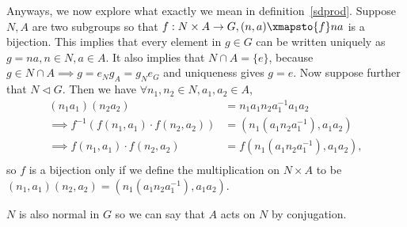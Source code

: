 Anyways, we now explore what exactly we mean in
definition~\ref{sdprod}. Suppose $N, A$ are two subgroups so that $f : N
\times A \to G, (n, a) \xmapsto{f} na$ is a bijection. This implies that
every element in $g \in G$ can be written uniquely as $g = na, n \in N,
a \in A$.  It also implies that $N \cap A = \lbrace e \rbrace$, because
$g \in N \cap A \implies g = e_N g_A = g_N e_G$ and uniqueness gives $g
= e$. Now suppose further that $N \lhd G$. Then we have $\forall n_1,
n_2 \in N, a_1, a_2 \in A$,
\[ \begin{aligned}
(n_1 a_1)(n_2 a_2) &= n_1 a_1 n_2 a_1^{-1} a_1 a_2 \\
\implies f^{-1}(f(n_1, a_1) \cdot f(n_2, a_2)) &= (n_1 (a_1 n_2
a_1^{-1}), a_1 a_2) \\
\implies f(n_1, a_1) \cdot f(n_2, a_2) &= f(n_1 (a_1 n_2 a_1^{-1}), a_1
a_2), \\
\end{aligned} \]
so $f$ is a bijection only if we define the multiplication on $N \times
A$ to be $(n_1, a_1)(n_2, a_2) = (n_1 (a_1 n_2 a_1^{-1}), a_1 a_2)$.

$N$ is also normal in $G$ so we can say that $A$ acts on $N$ by
conjugation.
